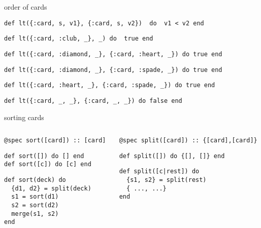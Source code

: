\begin{frame}[fragile]{order of cards}

\pause
\begin{verbatim}
def lt({:card, s, v1}, {:card, s, v2})  do  v1 < v2 end
\end{verbatim}
\pause
\begin{verbatim}
def lt({:card, :club, _}, _) do  true end
\end{verbatim}
\pause
\begin{verbatim}
def lt({:card, :diamond, _}, {:card, :heart, _}) do true end
\end{verbatim}
\pause
\begin{verbatim}
def lt({:card, :diamond, _}, {:card, :spade, _}) do true end
\end{verbatim}
\pause
\begin{verbatim}
def lt({:card, :heart, _}, {:card, :spade, _}) do true end
\end{verbatim}
\pause
\begin{verbatim}
def lt({:card, _, _}, {:card, _, _}) do false end
\end{verbatim}

\end{frame}

\begin{frame}[fragile]{sorting cards}

\begin{columns}

 \begin{column}{0.4\linewidth}
\begin{verbatim}
@spec sort([card]) :: [card]
\end{verbatim}
\begin{verbatim}
def sort([]) do [] end
def sort([c]) do [c] end
\end{verbatim}
\pause
\begin{verbatim}
def sort(deck) do
  {d1, d2} = split(deck)
  s1 = sort(d1)
  s2 = sort(d2)
  merge(s1, s2)
end
\end{verbatim}
 \end{column}
 
 \pause

 \begin{column}{0.5\linewidth}
\begin{verbatim}
@spec split([card]) :: {[card],[card]}
\end{verbatim}
\pause
\begin{verbatim}
def split([]) do {[], []} end
\end{verbatim}
\begin{verbatim}
def split([c|rest]) do 
  {s1, s2} = split(rest)
  { ..., ...}
end
\end{verbatim}
 \end{column}
\end{columns}

\end{frame}

